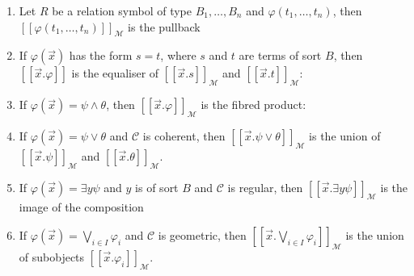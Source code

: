 \documentclass[a4paper]{article}
\theoremstyle{defin}
\theoremstyle{theorem}
\theoremstyle{claim}
\theoremstyle{prop}
\theoremstyle{lemma}
\theoremstyle{fact}
\theoremstyle{ex}
\theoremstyle{col}
\begin{document}
\begin{enumerate}
\item Let $R$ be a relation symbol of type $B_1, \dots, B_n$ and $\varphi(t_1, \dots, t_n)$, then $[\![\varphi(t_1, \dots, t_n)]\!]_{\mathcal{M}}$ is the pullback

\centerline{
}

\item If $\varphi(\vec{x})$ has the form $s = t$, where $s$ and $t$ are terms of sort $B$, then $[\![\vec{x}.\varphi]\!]$ is the equaliser of $[\![\vec{x}.s]\!]_{\mathcal{M}}$ and $[\![\vec{x}.t]\!]_{\mathcal{M}}$:

\centerline{
}

\item If $\varphi(\vec{x}) = \psi \land \theta$, then $[\![\vec{x}. \varphi]\!]_{\mathcal{M}}$ is the fibred product:

\centerline{
}

\item If $\varphi(\vec{x}) = \psi \lor \theta$ and $\mathcal{C}$ is coherent, then $[\![\vec{x}. \psi \lor \theta]\!]_{\mathcal{M}}$ is the union of $[\![\vec{x}. \psi]\!]_{\mathcal{M}}$ and $[\![\vec{x}. \theta]\!]_{\mathcal{M}}$.

\item If $\varphi(\vec{x}) = \exists y \psi$ and $y$ is of sort $B$ and $\mathcal{C}$ is regular, then $[\![\vec{x}. \exists y \psi]\!]_{\mathcal{M}}$ is the image of the composition

\centerline{
}

\item If $\varphi(\vec{x}) = \bigvee \limits_{i \in I} \varphi_i$ and $\mathcal{C}$ is geometric, then $[\![\vec{x}. \bigvee \limits_{i \in I} \varphi_i]\!]_{\mathcal{M}}$ is the union of subobjects $[\![\vec{x}. \varphi_i]\!]_{\mathcal{M}}$.
\end{enumerate}
\end{document}
